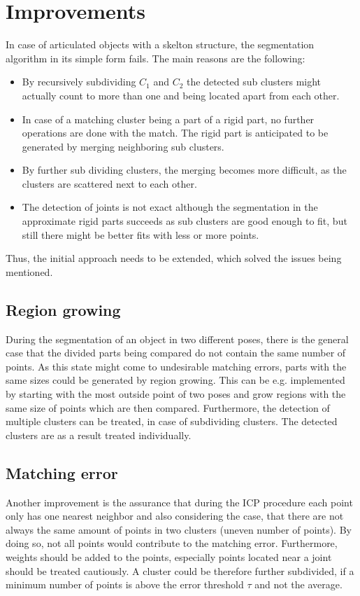 \chapter{Improvements}

In case of articulated objects with a skelton structure, the segmentation algorithm in its simple form fails. The main reasons are the following:
\begin{itemize}
	\item By recursively subdividing $C_1$ and $C_2$ the detected sub clusters might actually count to more than one and being located apart from each other. 
	\item In case of a matching cluster being a part of a rigid part, no further operations are done with the match. The rigid part is anticipated to be generated by merging neighboring sub clusters.
	\item By further sub dividing clusters, the merging becomes more difficult, as the clusters are scattered next to each other.
	\item The detection of joints is not exact although the segmentation in the approximate rigid parts succeeds as sub clusters are good enough to fit, but still there might be better fits with less or more points.
\end{itemize}
Thus, the initial approach needs to be extended, which solved the issues being mentioned.

\section{Region growing}
During the segmentation of an object in two different poses, there is the general case that the divided parts being compared do not contain the same number of points. As this state might come to undesirable matching errors, parts with the same sizes could be generated by region growing. This can be e.g. implemented by starting with the most outside point of two poses and grow regions with the same size of points which are then compared. Furthermore, the detection of multiple clusters can be treated, in case of subdividing clusters. The detected clusters are as a result treated individually.

\section{Matching error}
Another improvement is the assurance that during the ICP procedure each point only has one nearest neighbor and also considering the case, that there are not always the same amount of points in two clusters (uneven number of points). By doing so, not all points would contribute to the matching error. Furthermore, weights should be added to the points, especially points located near a joint should be treated cautiously. A cluster could be therefore further subdivided, if a minimum number of points is above the error threshold $\tau$ and not the average. 

